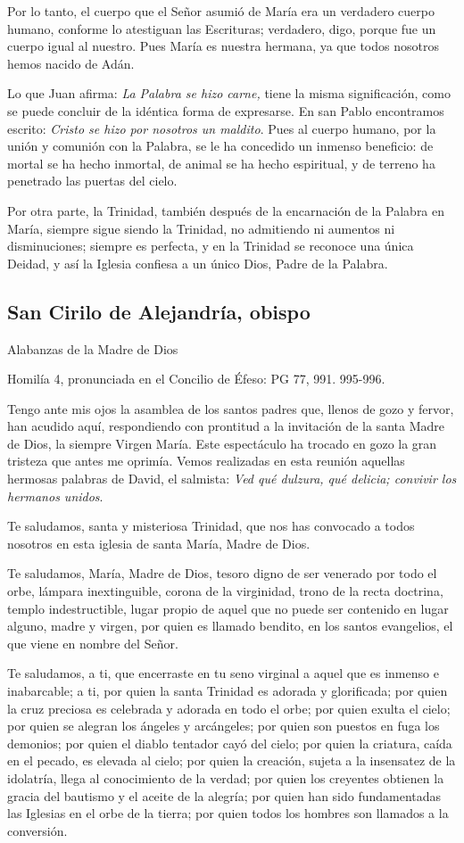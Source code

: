 Por lo tanto, el cuerpo que el Señor asumió de María era un verdadero cuerpo humano, conforme lo atestiguan las Escrituras; verdadero, digo, porque fue un cuerpo igual al nuestro. Pues María es nuestra hermana, ya que todos nosotros hemos nacido de Adán.

Lo que Juan afirma: \emph{La Palabra se hizo carne,} tiene la misma significación, como se puede concluir de la idéntica forma de expresarse. En san Pablo encontramos escrito: \emph{Cristo se hizo por nosotros un maldito}. Pues al cuerpo humano, por la unión y comunión con la Palabra, se le ha concedido un inmenso beneficio: de mortal se ha hecho inmortal, de animal se ha hecho espiritual, y de terreno ha penetrado las puertas del cielo.

Por otra parte, la Trinidad, también después de la encarnación de la Palabra en María, siempre sigue siendo la Trinidad, no admitiendo ni aumentos ni disminuciones; siempre es perfecta, y en la Trinidad se reconoce una única Deidad, y así la Iglesia confiesa a un único Dios, Padre de la Palabra.

\subsection{San Cirilo de Alejandría, obispo }

Alabanzas de la Madre de Dios

Homilía 4, pronunciada en el Concilio de Éfeso: PG 77, 991. 995-996.

Tengo ante mis ojos la asamblea de los santos padres que, llenos de gozo y fervor, han acudido aquí, respondiendo con prontitud a la invitación de la santa Madre de Dios, la siempre Virgen María. Este espectáculo ha trocado en gozo la gran tristeza que antes me oprimía. Vemos realizadas en esta reunión aquellas hermosas palabras de David, el salmista: \emph{Ved qué dulzura, qué delicia; convivir los hermanos unidos}.

Te saludamos, santa y misteriosa Trinidad, que nos has convocado a todos nosotros en esta iglesia de santa María, Madre de Dios.

Te saludamos, María, Madre de Dios, tesoro digno de ser venerado por todo el orbe, lámpara inextinguible, corona de la virginidad, trono de la recta doctrina, templo indestructible, lugar propio de aquel que no puede ser contenido en lugar alguno, madre y virgen, por quien es llamado bendito, en los santos evangelios, el que viene en nombre del Señor.

Te saludamos, a ti, que encerraste en tu seno virginal a aquel que es inmenso e inabarcable; a ti, por quien la santa Trinidad es adorada y glorificada; por quien la cruz preciosa es celebrada y adorada en todo el orbe; por quien exulta el cielo; por quien se alegran los ángeles y arcángeles; por quien son puestos en fuga los demonios; por quien el diablo tentador cayó del cielo; por quien la criatura, caída en el pecado, es elevada al cielo; por quien la creación, sujeta a la insensatez de la idolatría, llega al conocimiento de la verdad; por quien los creyentes obtienen la gracia del bautismo y el aceite de la alegría; por quien han sido fundamentadas las Iglesias en el orbe de la tierra; por quien todos los hombres son llamados a la conversión.

